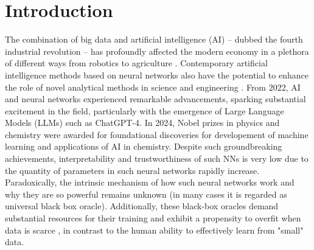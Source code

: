\documentclass[pra,showkeys,twocolumn,showpacs,aps,10pt]{revtex4-1}
\begin{document}
\maketitle



\section{Introduction}
The combination of big data and artificial intelligence (AI) --  dubbed the fourth industrial revolution -- has profoundly affected the modern economy in a plethora of different ways from robotics to agriculture \cite{Lecun2015, ghahramani2015,schwab2017,esteva2019, tyrsa2017}.
Contemporary artificial intelligence methods based on neural networks also have the potential to enhance the role of novel analytical methods in science and engineering \cite{kaggle2014, radovic2018, butler2018, radovic2018}.
From 2022, AI and neural networks experienced remarkable advancements, sparking substantial excitement in the field, particularly with the emergence of Large Language Models (LLMs) such as ChatGPT-4\cite{GPT4}. In 2024, Nobel prizes in physics\cite{NobelPrizePhysics} and chemistry\cite{NobelPrizeChemistry} were awarded for foundational discoveries for developement of machine learning and applications of AI in chemistry.
Despite such groundbreaking achievements, interpretability and trustworthiness of such NNs is very low due to the quantity of parameters in such neural networks rapidly increase.
Paradoxically, the intrinsic mechanism of how such neural networks work and why they are so powerful remains unknown (in many cases it is regarded as universal black box oracle).
Additionally, these black-box oracles demand substantial resources for their training and exhibit a propensity to overfit when data is scarce \cite{sevilla2022compute}, in contrast to the human ability to effectively learn from "small" data. 

\end{document}
